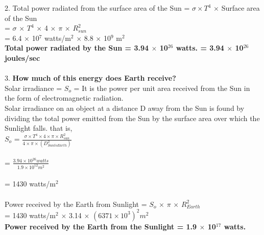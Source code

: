 \documentclass[11pt]{exam}
\begin{document}
\begin{questions}
{\begin{minipage}{42em}
                 2. Total power radiated from the surface area of the Sun = $\sigma \times T^{4}$ $\times$ Surface area of the Sun \\
                    = $\sigma$ $\times$ $T^{4}$ $\times$ 4 $\times$ $\pi$ $\times$  $R_{sun}^{2}$    \\
                    = 6.4 $\times$ 10$^{7}$ watts/m$^{2}$ $\times$ 8.8 $\times$ 10$^{9}$ m$^{2}$ \\
\textbf{ Total power radiated by the Sun  = 3.94 $\times$ 10$^{26}$ watts. =  3.94 $\times$ 10$^{26}$ joules/sec} \\ \\
                  3. \textbf{How much of this energy does Earth receive?} \\
                     Solar irradiance = $S_{o}$ = It is the power per unit area received  from the Sun in the form of electromagnetic radiation. %
                     \\ 
                     Solar irradiance on an object at a distance D away from the Sun is found by dividing the total power emitted from the Sun by the surface area over which the Sunlight falls. that is,\\
$S_{o}$ = $\frac{\sigma \times T^{4} \times 4 \times \pi \times  R_{sun}^{2}}{4 \times \pi \times (D_{SuntoEarth}^{2})}$ \\ \\
       = $\frac{3.94 \times 10^{26}watts}{1.9 \times 10^{12}m^{2}}$\\ \\
                     = 1430 watts/m$^{2}$ \\ \\
                     Power received by the Earth from Sunlight =  $S_{o}$ $\times$ $\pi$ $\times$ $R_{Earth}^{2}$ \\
                     = 1430 watts/m$^{2}$ $\times$ 3.14 $\times$ $(6371 \times 10^{3})^{2}m^{2}$ \\
                   \textbf{ Power received by the Earth from the Sunlight = 1.9 $\times$ 10$^{17}$ watts.} \\ \\

\end{minipage}}
\end{questions}
\end{document}
